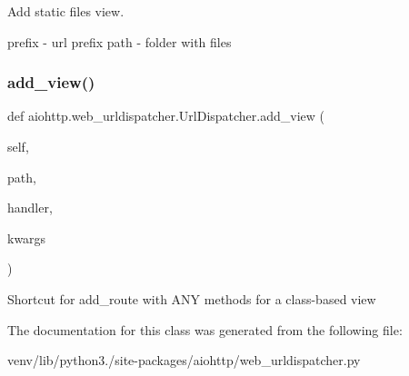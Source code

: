 \begin{DoxyVerb}Add static files view.

prefix - url prefix
path - folder with files\end{DoxyVerb}
 \mbox{\label{classaiohttp_1_1web__urldispatcher_1_1_url_dispatcher_a7cde1ed170743d73305dc54c19b87509}} 
\subsubsection{\texorpdfstring{add\+\_\+view()}{add\_view()}}
{\footnotesize\ttfamily def aiohttp.\+web\+\_\+urldispatcher.\+Url\+Dispatcher.\+add\+\_\+view (\begin{DoxyParamCaption}\item[{}]{self,  }\item[{}]{path,  }\item[{}]{handler,  }\item[{}]{kwargs }\end{DoxyParamCaption})}

\begin{DoxyVerb}Shortcut for add_route with ANY methods for a class-based view
\end{DoxyVerb}
 

The documentation for this class was generated from the following file\+:\begin{DoxyCompactItemize}
\item 
venv/lib/python3./site-\/packages/aiohttp/web\+\_\+urldispatcher.\+py\end{DoxyCompactItemize}
